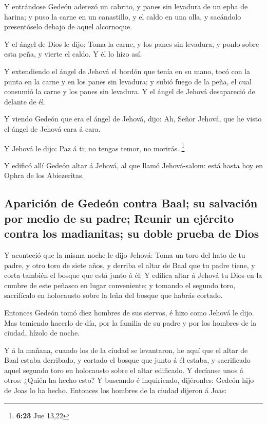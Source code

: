  Y entrándose Gedeón aderezó un cabrito, y panes sin
levadura de un epha de harina; y puso la carne en un canastillo, y el
caldo en una olla, y sacándolo presentóselo debajo de aquel alcornoque.

 Y el ángel de Dios le dijo: Toma la carne, y los panes
sin levadura, y ponlo sobre esta peña, y vierte el caldo. Y él lo hizo
así.

 Y extendiendo el ángel de Jehová el bordón que tenía en
su mano, tocó con la punta en la carne y en los panes sin levadura; y
subió fuego de la peña, el cual consumió la carne y los panes sin
levadura. Y el ángel de Jehová desapareció de delante de él.

 Y viendo Gedeón que era el ángel de Jehová, dijo: Ah,
Señor Jehová, que he visto el ángel de Jehová cara á cara.

 Y Jehová le dijo: Paz á ti; no tengas temor, no morirás.
\footnote{\textbf{6:23} Jue 13,22}

 Y edificó allí Gedeón altar á Jehová, al que llamó
Jehová-salom: está hasta hoy en Ophra de los Abiezeritas.

\hypertarget{apariciuxf3n-de-gedeuxf3n-contra-baal-su-salvaciuxf3n-por-medio-de-su-padre-reunir-un-ejuxe9rcito-contra-los-madianitas-su-doble-prueba-de-dios}{%
\subsection{Aparición de Gedeón contra Baal; su salvación por medio de
su padre; Reunir un ejército contra los madianitas; su doble prueba de
Dios}\label{apariciuxf3n-de-gedeuxf3n-contra-baal-su-salvaciuxf3n-por-medio-de-su-padre-reunir-un-ejuxe9rcito-contra-los-madianitas-su-doble-prueba-de-dios}}

 Y aconteció que la misma noche le dijo Jehová: Toma un
toro del hato de tu padre, y otro toro de siete años, y derriba el altar
de Baal que tu padre tiene, y corta también el bosque que está junto á
él:  Y edifica altar á Jehová tu Dios en la cumbre de
este peñasco en lugar conveniente; y tomando el segundo toro,
sacrifícalo en holocausto sobre la leña del bosque que habrás cortado.

 Entonces Gedeón tomó diez hombres de sus siervos, é hizo
como Jehová le dijo. Mas temiendo hacerlo de día, por la familia de su
padre y por los hombres de la ciudad, hízolo de noche.

 Y á la mañana, cuando los de la ciudad se levantaron, he
aquí que el altar de Baal estaba derribado, y cortado el bosque que
junto á él estaba, y sacrificado aquel segundo toro en holocausto sobre
el altar edificado.  Y decíanse unos á otros: ¿Quién ha
hecho esto? Y buscando é inquiriendo, dijéronles: Gedeón hijo de Joas lo
ha hecho. Entonces los hombres de la ciudad dijeron á Joas:

